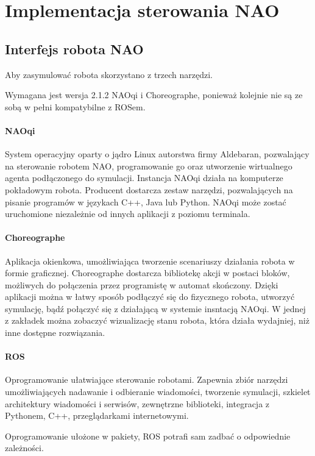\chapter{Implementacja sterowania NAO}
\section{Interfejs robota NAO}

Aby zasymulować robota skorzystano z trzech narzędzi. 

Wymagana jest wersja 2.1.2 NAOqi i Choreographe, ponieważ kolejnie nie są ze sobą w pełni kompatybilne z ROSem.

\subsubsection{NAOqi} System operacyjny oparty o jądro Linux autorstwa firmy Aldebaran, pozwalający na sterowanie robotem NAO, programowanie go oraz utworzenie wirtualnego agenta podłączonego do symulacji. Instancja NAOqi działa na komputerze pokładowym robota. Producent dostarcza zestaw narzędzi, pozwalających na pisanie programów w językach C++, Java lub Python. NAOqi może zostać uruchomione niezależnie od innych aplikacji z poziomu terminala.

\subsubsection{Choreographe} Aplikacja okienkowa, umożliwiająca tworzenie scenariuszy działania robota w formie graficznej. Choreographe dostarcza bibliotekę akcji w postaci bloków, możliwych do połączenia przez programistę w automat skończony. Dzięki aplikacji można w łatwy sposób podłączyć się do fizycznego robota, utworzyć symulację, bądź połączyć się z działającą w systemie insntacją NAOqi. W jednej z zakładek można zobaczyć wizualizację stanu robota, która działa wydajniej, niż inne dostępne rozwiązania.

\subsubsection{ROS} Oprogramowanie ułatwiające sterowanie robotami. Zapewnia zbiór narzędzi umożliwiających nadawanie i odbieranie wiadomości, tworzenie symulacji, szkielet architektury wiadomości i serwisów, zewnętrzne biblioteki, integracja z Pythonem, C++, przeglądarkami internetowymi.

Oprogramowanie ułożone w pakiety, ROS potrafi sam zadbać o odpowiednie zależności.

